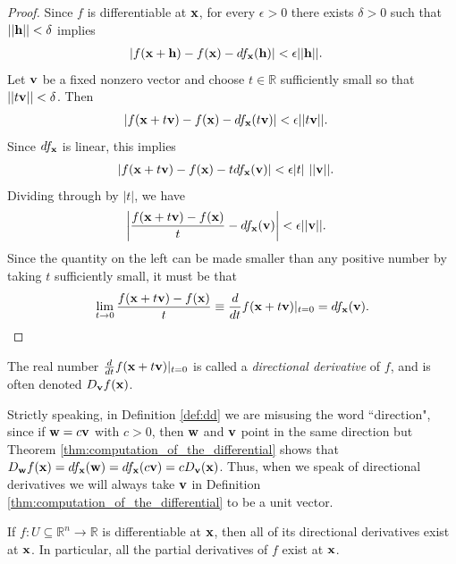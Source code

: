 \documentclass[12pt,letterpaper,reqno]{article}
\numberwithin{equation}{section}
\newcommand{\bh}{{\bf h}}
\newcommand{\R}{\ensuremath{\mathbb R}}
\newcommand{\bv}{{\bf v}}
\newcommand{\bw}{{\bf w}}
\newcommand{\bx}{{\bf x}}
\begin{document}
{\begin{proof}
	Since $f$ is differentiable at $\bx$, for every $\epsilon>0$ there exists $\delta>0$ such that $||\bh||<\delta$ implies
	\begin{align*}
		|f(\bx+\bh)-f(\bx)-df_\bx(\bh)|&<\epsilon ||\bh||.
	\end{align*}
	Let $\bv$ be a fixed nonzero vector and choose $t \in \R$ sufficiently small so that $||t \bv||<\delta$. Then 
	\begin{align*}
		|f(\bx+t\bv)-f(\bx)-df_\bx(t\bv)|&<\epsilon ||t\bv||.
	\end{align*} 
	Since $df_\bx$ is linear, this implies
	\begin{align*}
				|f(\bx+t\bv)-f(\bx)-t df_\bx(\bv)|&<\epsilon |t| \ ||\bv||.
	\end{align*}
	Dividing through by $|t|$, we have
	\begin{align*}
		\left|\frac{f(\bx+t\bv)-f(\bx)}{t}-df_\bx(\bv)\right|&<\epsilon||\bv||.
	\end{align*}
	Since the quantity on the left can be made smaller than any positive number by taking $t$ sufficiently small, it must be that
	\begin{align*}
		\lim_{t \to 0}\frac{f(\bx+t\bv)-f(\bx)}{t}\equiv \frac{d}{dt}f(\bx+t\bv)|_{t=0}=df_\bx(\bv).
	\end{align*}
\end{proof}

\begin{defn}\label{def:dd}
The real number	$\frac{d}{dt}f(\bx+t\bv)|_{t=0}$ is called a \emph{directional derivative} of $f$, and is often denoted $D_\bv f(\bx)$. 
\end{defn}

\begin{remark}
	Strictly speaking, in Definition \ref{def:dd} we are misusing the word ``direction", since if $\bw=c\bv$ with $c>0$, then $\bw$ and $\bv$ point in the same direction but Theorem \ref{thm:computation_of_the_differential} shows that $D_\bw f(\bx)=df_\bx(\bw)=df_\bx(c\bv)=cD_\bv(\bx)$. Thus, when we speak of directional derivatives we will always take $\bv$ in Definition \ref{thm:computation_of_the_differential} to be a unit vector.
\end{remark}

\begin{cor}\label{cor:diff_imp_dd}
If $f:U \subseteq \R^n \to \R$ is differentiable at $\bx$, then all of its directional derivatives exist at $\bx$. In particular, all the partial derivatives of $f$ exist at $\bx$.	
\end{cor}

}
\end{document}
